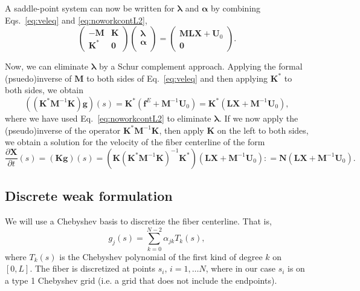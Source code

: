 A saddle-point system can now be written for $\bm{\lambda}$ and $\bm{\alpha}$ by combining Eqs.\ \eqref{eq:veleq} and \eqref{eq:noworkcontL2}, 
\begin{equation}
\label{eq:saddleL2}
    \begin{pmatrix}
    -\bm{M} & \bm{K}\\[4 pt]
    \bm{K}^* & \bm{0}
    \end{pmatrix}
    \begin{pmatrix} 
    \bm{\lambda}\\[4 pt]
    \bm{\alpha}\\[4 pt]
    \end{pmatrix} =  \begin{pmatrix} 
    \bm{M}\bm{L}\bm{X}+\bm{U}_0\\[4 pt]
    \bm{0}\end{pmatrix}.
\end{equation}

Now, we can eliminate $\bm{\lambda}$ by a Schur complement approach. Applying the formal (psuedo)inverse of $\bm{M}$ to both sides of Eq.\ \eqref{eq:veleq} and then applying $\bm{K}^*$ to both sides, we obtain
\begin{equation}
\left(\left(\bm{K}^*\bm{M}^{-1} \bm{K}\right)\bm{g}\right)(s) = \bm{K}^*\left(\bm{f}^E+\bm{M}^{-1}\bm{U}_0\right)=\bm{K}^*\left(\bm{L}\bm{X}+\bm{M}^{-1}\bm{U}_0\right),
\end{equation}
where we have used Eq.\ \eqref{eq:noworkcontL2} to eliminate $\bm{\lambda}$. If we now apply the (pseudo)inverse of the operator $\bm{K}^*\bm{M}^{-1}\bm{K}$, then apply $\bm{K}$ on the left to both sides, we obtain a solution for the velocity of the fiber centerline of the form
\begin{equation}
\frac{\partial \bm{X}}{\partial t}(s) = \left(\bm{K}\bm{g}\right)(s) = \left(\bm{K}\left(\bm{K}^*\bm{M}^{-1}\bm{K}\right)^{-1}\bm{K}^*\right)\left(\bm{L}\bm{X}+\bm{M}^{-1}\bm{U}_0\right):
=\bm{N}\left(\bm{L}\bm{X}+\bm{M}^{-1}\bm{U}_0\right). 
\end{equation}

\subsection{Discrete weak formulation}
We will use a Chebyshev basis to discretize the fiber centerline. That is, 
\begin{equation}
\label{eq:basisD}
g_j(s) = \sum_{k=0}^{N-2} \alpha_{jk} T_k(s), 
\end{equation}
where $T_k(s)$ is the Chebyshev polynomial of the first kind of degree $k$ on $[0,L]$. The fiber is discretized at points $s_i$, $i=1, \dots N$, where in our case $s_i$ is on a type 1 Chebyshev grid (i.e. a grid that does not include the endpoints). 

